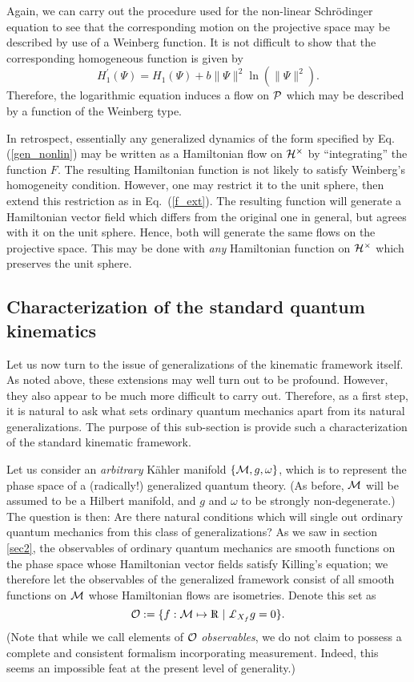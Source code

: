 \documentclass[12pt,aps,eqsecnum,tighten]{revtex4-2}
\def\be{\begin{equation}}
\def\ee{\end{equation}}
\def\punctH{{\cal H}^{\times}}
\def\P{{\cal P}}
\def\M{{\cal M}}
\def\w{\omega}
\newcommand{\eqn}[1]{Eq.~(\ref{#1})}
\newcommand{\lie}[1]{{\pounds}_{#1}}
\newcommand{\hvf}[1]{{X_{#1}}}
\def\Rl{{\mathchoice 
{\setbox0=\hbox{$\displaystyle\rm R$}\hbox{\hbox to0pt
{\kern0.4\wd0\vrule height0.9\ht0\hss}\box0}}
{\setbox0=\hbox{$\textstyle\rm R$}\hbox{\hbox to0pt
{\kern0.4\wd0\vrule height0.9\ht0\hss}\box0}}
{\setbox0=\hbox{$\scriptstyle\rm R$}\hbox{\hbox to0pt
{\kern0.4\wd0\vrule height0.9\ht0\hss}\box0}}
{\setbox0=\hbox{$\scriptscriptstyle\rm R$}\hbox{\hbox to0pt
{\kern0.4\wd0\vrule height0.9\ht0\hss}\box0}}}}
\def\Rl{{\mathchoice
{\setbox0=\hbox{$\displaystyle\rm R$}\hbox{\hbox to0pt
{\kern0.4\wd0\vrule height0.9\ht0\hss}\box0}}
{\setbox0=\hbox{$\textstyle\rm R$}\hbox{\hbox to0pt
{\kern0.4\wd0\vrule height0.9\ht0\hss}\box0}}
{\setbox0=\hbox{$\scriptstyle\rm R$}\hbox{\hbox to0pt
{\kern0.4\wd0\vrule height0.9\ht0\hss}\box0}}
{\setbox0=\hbox{$\scriptscriptstyle\rm R$}\hbox{\hbox to0pt
{\kern0.4\wd0\vrule height0.9\ht0\hss}\box0}}}}
\def\R{\Rl}
\begin{document}
Again, we can carry out the procedure used for the non-linear
Schr\"odinger equation to see that the corresponding motion on the
projective space may be described by use of a Weinberg function.  It
is not difficult to show that the corresponding homogeneous function
is given by
%
\be
 H_1^\prime(\Psi) = H_1(\Psi) + b\|\Psi\|^2 \ln( \| \Psi \|^2 ).
\ee
%
Therefore, the logarithmic equation induces a flow on $\P$ which may
be described by a function of the Weinberg type.

In retrospect, essentially any generalized dynamics of the form
specified by Eq. (\ref{gen_nonlin}) may be written as a Hamiltonian
flow on $\punctH$ by ``integrating'' the function $F$.  The resulting
Hamiltonian function is not likely to satisfy Weinberg's homogeneity
condition.  However, one may restrict it to the unit sphere, then
extend this restriction as in \eqn{f_ext}.  The resulting function
will generate a Hamiltonian vector field which differs from the
original one in general, but agrees with it on the unit sphere.
Hence, both will generate the same flows on the projective space.
This may be done with {\em any} Hamiltonian function on $\punctH$
which preserves the unit sphere.




\subsection{Characterization of the standard quantum kinematics}
\label{sec3.B}					

Let us now turn to the issue of generalizations of the kinematic
framework itself. As noted above, these extensions may well turn out
to be profound. However, they also appear to be much more difficult to
carry out. Therefore, as a first step, it is natural to ask what sets
ordinary quantum mechanics apart from its natural generalizations.
The purpose of this sub-section is provide such a characterization of
the standard kinematic framework.

Let us consider an {\em arbitrary} K\"ahler manifold $\{ \M, g, \w
\}$, which is to represent the phase space of a (radically!)
generalized quantum theory. (As before, $\M$ will be assumed to be a
Hilbert manifold, and $g$ and $\w$ to be strongly non-degenerate.)
The question is then: Are there natural conditions which
will single out ordinary quantum mechanics from this class of
generalizations?  As we saw in section \ref{sec2}, the observables of
ordinary quantum mechanics are smooth functions on the phase space
whose Hamiltonian vector fields satisfy Killing's equation; we
therefore let the observables of the generalized framework consist of
all smooth functions on $\M$ whose Hamiltonian flows are
isometries. Denote this set as
%
\be
  {\cal O} := \{ f: \M \mapsto \R \; | \; \lie{\hvf{f}} g = 0 \}.
\ee
%
(Note that while we call elements of ${\cal O}$ {\em observables},
we do not claim to possess a complete and consistent formalism
incorporating measurement. Indeed, this seems an impossible feat at
the present level of generality.)
\end{document}
